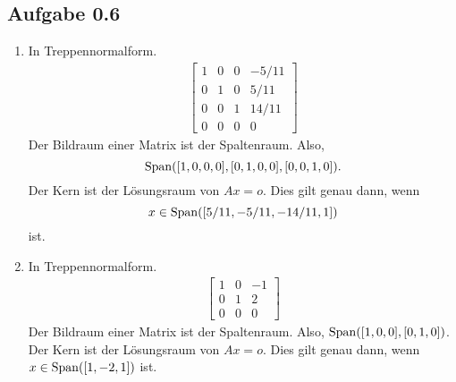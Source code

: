 \subsection*{Aufgabe 0.6}
\begin{enumerate}
\item In Treppennormalform.
  \begin{align*}
    \begin{bmatrix}
      1 & 0 & 0 & -5/11 \\
      0 & 1 & 0 & 5/11 \\
      0 & 0 & 1 & 14/11 \\
      0 & 0 & 0 & 0
    \end{bmatrix}
  \end{align*}
  Der Bildraum einer Matrix ist der Spaltenraum.  Also, \[\operatorname{Span}([1, 0,
  0, 0], [0, 1, 0, 0], [0, 0, 1, 0]).\] Der Kern ist der Lösungsraum
  von \(A x = o\).  Dies gilt genau dann, wenn \[x \in \operatorname{Span}([5/11,
  -5/11, -14/11, 1])\] ist.
\item In Treppennormalform.
  \begin{align*}
    \begin{bmatrix}
      1 & 0 & -1 \\
      0 & 1 & 2 \\
      0 & 0 & 0
    \end{bmatrix}
  \end{align*}
  Der Bildraum einer Matrix ist der Spaltenraum.  Also,
  \(\operatorname{Span}([1, 0, 0], [0, 1, 0])\). Der Kern ist der Lösungsraum von
  \(A x = o\).  Dies gilt genau dann, wenn
  \(x \in \operatorname{Span}([1, -2, 1])\) ist.
\end{enumerate}
